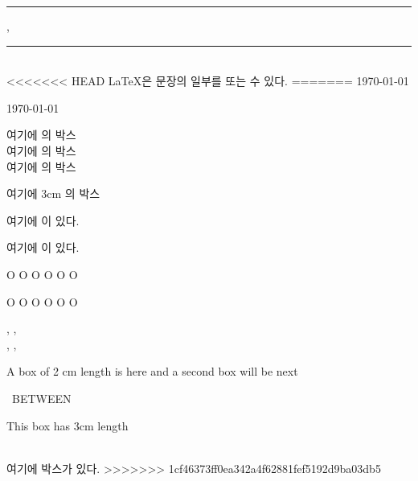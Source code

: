 \documentclass[11pt]{article}
\begin{document}
\normalmarginpar
\addtolength{\marginparwidth}{1cm}

\rule{3mm}{3mm}, \rule[2mm]{3mm}{3mm}

\fbox{\rule{1cm}{0cm}\rule{0cm}{1cm}} \\



<<<<<<< HEAD
\LaTeX 은 문장의 일부를 \raisebox{.6ex}{올리거나} 또는 \raisebox{-.6ex}{내릴} 수 있다.
=======
\hfill \today 

\null \hfill \today

여기에 \makebox[2cm]{2cm}의 박스 \\

여기에 \makebox[2cm][l]{2cm}의 박스 \\

여기에 \makebox[2cm][r]{2cm}의 박스 

여기에 3cm 의 박스

여기에 이 있다.

여기에 이 있다.

O O O  O O O

O O O  O O O



, ,  \\

, ,  \\

\parbox{2in}{A box of 2 cm length is here and a second box will be next} \ \hfill BETWEEN \ \hfill \parbox{3cm}{This box has 3cm length} \\

여기에 \hfill {} \hfill 박스가 있다.
>>>>>>> 1cf46373ff0ea342a4f62881fef5192d9ba03db5
\end{document}
